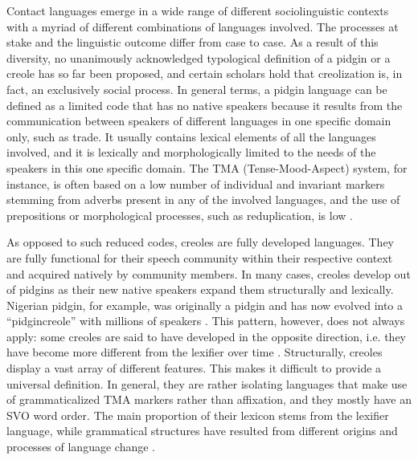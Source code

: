 \documentclass[output=paper]{langscibook}
\begin{document}
Contact languages emerge in a wide range of different sociolinguistic contexts with a myriad of different combinations of languages involved. The processes at stake and the linguistic outcome differ from case to case. As a result of this diversity, no unanimously acknowledged typological definition of a pidgin or a creole has so far been proposed, and certain scholars \parencite[e.g.][]{mufwene2008language} hold that creolization is, in fact, an exclusively social process. In general terms, a pidgin language can be defined as a limited code that has no native speakers because it results from the communication between speakers of different languages in one specific domain only, such as trade. It usually contains lexical elements of all the languages involved, and it is lexically and morphologically limited to the needs of the speakers in this one specific domain. The TMA (Tense-Mood-Aspect) system, for instance, is often based on a low number of individual and invariant markers stemming from adverbs present in any of the involved languages, and the use of prepositions or morphological processes, such as reduplication, is low \citep{bakker2008pidgins}.

As opposed to such reduced codes, creoles are fully developed languages. They are fully functional for their speech community within their respective context and acquired natively by community members. In many cases, creoles develop out of pidgins as their new native speakers expand them structurally and lexically. Nigerian pidgin, for example, was originally a pidgin and has now evolved into a “pidgincreole” with millions of speakers \citep{bakker2008pidgins}. This pattern, however, does not always apply: some creoles are said to have developed in the opposite direction, i.e. they have become more different from the lexifier over time \citep{chaudenson2001creolization}. Structurally, creoles display a vast array of different features. This makes it difficult to provide a universal definition. In general, they are rather isolating languages that make use of grammaticalized TMA markers rather than affixation, and they mostly have an SVO word order. The main proportion of their lexicon stems from the lexifier language, while grammatical structures have resulted from different origins and processes of language change \citep{bakker2008pidgins, bartens2013creole}.
\end{document}
